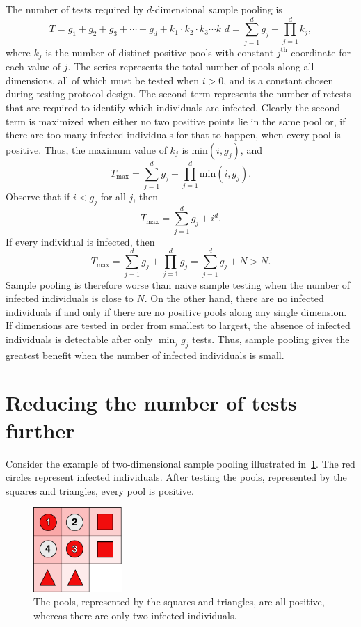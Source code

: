 \documentclass[letterpaper]{article}
\begin{document}
The number of tests required by $d$-dimensional sample pooling is 
\[
T = g_1+g_2+g_3+\cdots + g_d + k_1\cdot k_2 \cdot k_3
\cdots k\_d = \sum_{j=1}^d g_j + \prod_{j=1}^d k_j,
\]
where $k_j$ is the number of distinct positive pools with constant
$j^{\text{th}}$ coordinate for each value of $j$. The series
represents the total number of pools along all dimensions, all of which
must be tested when $i>0$, and is a constant chosen during testing
protocol design. The second term represents the number of retests that
are required to identify which individuals are infected. Clearly the
second term is maximized when either no two positive points lie in the
same pool or, if there are too many infected individuals for that to
happen, when every pool is positive. Thus, the maximum value of $k_j$
is min$(i, g_j)$, and
\[
T_{\text{max}}=\sum_{j=1}^d g_j + \prod_{j=1}^d \text{min}(i, g_j).
\]
Observe that if $i<g_j$ for all $j$, then
\[
T_{\text{max}}=\sum_{j=1}^d g_j + i^d.
\] 
If every individual is infected, then
\[
T_{\text{max}}=\sum_{j=1}^d g_j + \prod_{j=1}^d g_j = \sum_{j=1}^d g_j + N > N.
\]
Sample pooling is therefore worse than naive sample testing when the
number of infected individuals is close to $N$. On the other hand,
there are no infected individuals if and only if there are no positive
pools along any single dimension. If dimensions are tested in order from
smallest to largest, the absence of infected individuals is detectable
after only $\min_j g_j$ tests. Thus, sample pooling gives the
greatest benefit when the number of infected individuals is small.

\hypertarget{reducing-the-number-of-tests-further}{%
\section{Reducing the number of tests further}
\label{reducing-the-number-of-tests-further}}

Consider the example of two-dimensional sample pooling illustrated
in~\ref{fig:shortcut}. The red circles represent infected individuals. 
After testing the pools, represented by the squares and triangles, 
every pool is positive.


\begin{figure}
	\centering
	\includegraphics[width=0.3\textwidth]{Shortcut}
	\caption{The pools, represented by the squares and triangles, are
		all positive, whereas there are only two infected individuals.}
	\label{fig:shortcut}
\end{figure}
\end{document}
